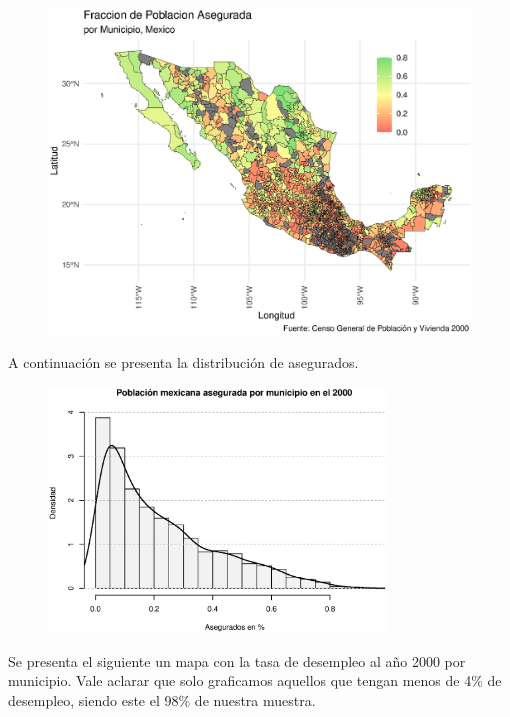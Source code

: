 \documentclass[9pt]{article}
\begin{document}
\begin{figure}[H]
     \centering
     \includegraphics[width=\textwidth]{figs/insured.eps}
 \end{figure}

 A continuaci\'on se presenta la distribuci\'on de asegurados.
 \begin{figure}[H]
     \centering
     \includegraphics[width=0.8\textwidth]{figs/histinsured.eps}
 \end{figure}
\newpage
Se presenta el siguiente un mapa con la tasa de desempleo al a\~no 2000 por municipio. Vale aclarar que solo graficamos aquellos que tengan menos de 4\% de desempleo, siendo este el 98\% de nuestra muestra.
\end{document}
